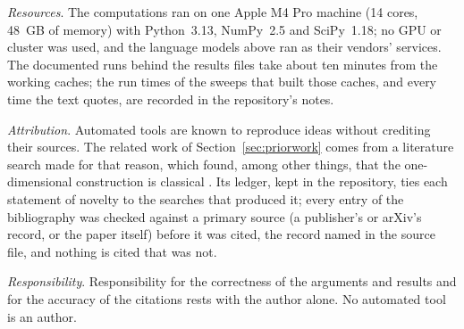 \documentclass[11pt]{amsart}
\theoremstyle{definition}
\theoremstyle{remark}
\newcommand{\para}[1]{\par\smallskip\noindent\textit{#1}.\enspace}
\begin{document}
\para{Resources}
The computations ran on one Apple M4 Pro machine (14 cores, 48~GB of
memory) with Python~3.13, NumPy~2.5 and SciPy~1.18; no GPU or cluster was
used, and the language models above ran as their vendors' services. The
documented runs behind the results files take about ten minutes from the
working caches; the run times of the sweeps that built those caches, and
every time the text quotes, are recorded in the repository's notes.

\para{Attribution}
Automated tools are known to reproduce ideas without crediting their
sources. The related work of Section~\ref{sec:priorwork} comes from a
literature search made for that reason, which found, among other things,
that the one-dimensional construction is classical
\cite{Kravchenko2008,KravchenkoPorter2010}. Its ledger, kept in the
repository, ties each statement of novelty to the searches that produced
it; every entry of the bibliography was checked against a primary source
(a publisher's or arXiv's record, or the paper itself) before it was
cited, the record named in the source file, and nothing is cited that was
not.

\para{Responsibility}
Responsibility for the correctness of the arguments and results and for
the accuracy of the citations rests with the author alone. No automated
tool is an author.



\end{document}
